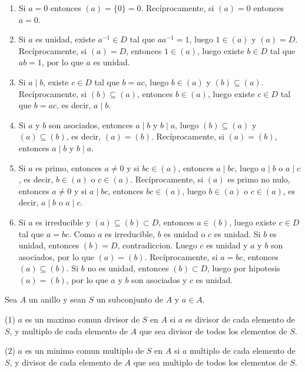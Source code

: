 \begin{proofbox}

\begin{enumerate}
    \item Si \(a = 0\) entonces \((a) = \{0\} = 0\). Recíprocamente, si \((a) = 0\) entonces \(a = 0\).

    \item Si \(a\) es unidad, existe \(a^{-1} \in D\) tal que \(aa^{-1} = 1\), luego \(1 \in (a)\) y \((a) = D\). Recíprocamente, si \((a) = D\), entonces \(1 \in (a)\), luego existe \(b \in D\) tal que \(ab = 1\), por lo que \(a\) es unidad.

    \item Si \(a \mid b\), existe \(c \in D\) tal que \(b = ac\), luego \(b \in (a)\) y \((b) \subseteq (a)\). Recíprocamente, si \((b) \subseteq (a)\), entonces \(b \in (a)\), luego existe \(c \in D\) tal que \(b = ac\), es decir, \(a \mid b\).

    \item Si \(a\) y \(b\) son asociados, entonces \(a \mid b\) y \(b \mid a\), luego \((b) \subseteq (a)\) y \((a) \subseteq (b)\), es decir, \((a) = (b)\). Recíprocamente, si \((a) = (b)\), entonces \(a \mid b\) y \(b \mid a\).

    \item Si \(a\) es primo, entonces \(a \neq 0\) y si \(bc \in (a)\), entonces \(a \mid bc\), luego \(a \mid b\) o \(a \mid c\), es decir, \(b \in (a)\) o \(c \in (a)\). Recíprocamente, si \((a)\) es primo no nulo, entonces \(a \neq 0\) y si \(a \mid bc\), entonces \(bc \in (a)\), luego \(b \in (a)\) o \(c \in (a)\), es decir, \(a \mid b\) o \(a \mid c\).

    \item Si \(a\) es irreducible y \((a) \subseteq (b) \subset D\), entonces \(a \in (b)\), luego existe \(c \in D\) tal que \(a = bc\). Como \(a\) es irreducible, \(b\) es unidad o \(c\) es unidad. Si \(b\) es unidad, entonces \((b) = D\), contradiccion. Luego \(c\) es unidad y \(a\) y \(b\) son asociados, por lo que \((a) = (b)\). Recíprocamente, si \(a = bc\), entonces \((a) \subseteq (b)\). Si \(b\) no es unidad, entonces \((b) \subset D\), luego por hipotesis \((a) = (b)\), por lo que \(a\) y \(b\) son asociados y \(c\) es unidad.
\end{enumerate}

\end{proofbox}

\begin{definition}{}{}
Sea \(A\) un anillo y sean \(S\) un subconjunto de \(A\) y \(a \in A\).

(1) \(a\) es un maximo comun divisor de \(S\) en \(A\) si \(a\) es divisor de cada elemento de \(S\), y multiplo de cada elemento de \(A\) que sea divisor de todos los elementos de \(S\).

(2) \(a\) es un minimo comun multiplo de \(S\) en \(A\) si \(a\) multiplo de cada elemento de \(S\), y divisor de cada elemento de \(A\) que sea multiplo de todos los elementos de \(S\).
\end{definition}


